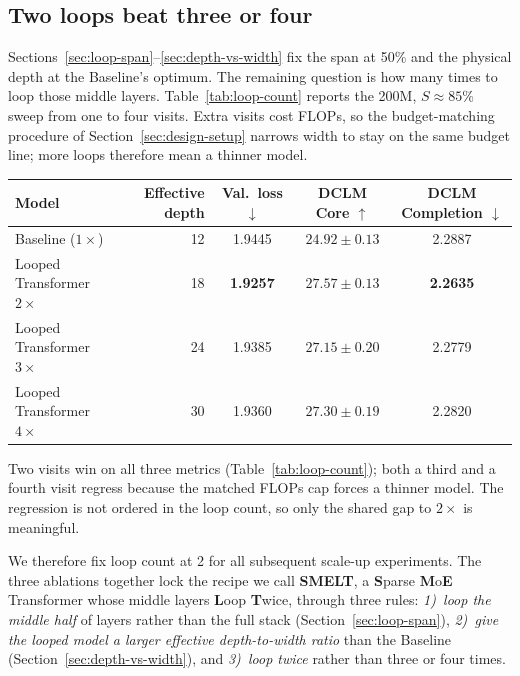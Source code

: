 \documentclass[]{bytedance_seed}
\newcommand{\archname}{SMELT}
\theoremstyle{definition}
\theoremstyle{remark}
\begin{document}
\subsection{Two loops beat three or four}
\label{sec:loop-count}

Sections~\ref{sec:loop-span}--\ref{sec:depth-vs-width} fix the span at 50\% and the physical depth at the Baseline's optimum.
%
The remaining question is how many times to loop those middle layers.
%
Table~\ref{tab:loop-count} reports the 200M, $S \approx 85\%$ sweep from one to four visits.
%
Extra visits cost FLOPs, so the budget-matching procedure of Section~\ref{sec:design-setup} narrows width to stay on the same budget line; more loops therefore mean a thinner model.
%

\begin{center}
\begin{minipage}{\linewidth}
\small
{}
\label{tab:loop-count}
\centering
\begin{tabular}{lrccc}
\toprule
Model & Effective depth & Val.\ loss $\downarrow$ & DCLM Core $\uparrow$ & DCLM Completion $\downarrow$ \\
\midrule
Baseline ($1\times$) & 12 & 1.9445 & $24.92 \pm 0.13$ & 2.2887 \\
Looped Transformer $2\times$ & 18 & \textbf{1.9257} & $\mathbf{27.57 \pm 0.13}$ & \textbf{2.2635} \\
Looped Transformer $3\times$ & 24 & 1.9385 & $27.15 \pm 0.20$ & 2.2779 \\
Looped Transformer $4\times$ & 30 & 1.9360 & $27.30 \pm 0.19$ & 2.2820 \\
\bottomrule
\end{tabular}
\end{minipage}
\end{center}

Two visits win on all three metrics (Table~\ref{tab:loop-count}); both a third and a fourth visit regress because the matched FLOPs cap forces a thinner model.
%
The regression is not ordered in the loop count, so only the shared gap to $2\times$ is meaningful.
%

We therefore fix loop count at 2 for all subsequent scale-up experiments.
%
The three ablations together lock the recipe we call \textbf{\archname{}}, a \textbf{S}parse \textbf{M}o\textbf{E} Transformer whose middle layers \textbf{L}oop \textbf{T}wice, through three rules: \textit{1)~loop the middle half} of layers rather than the full stack (Section~\ref{sec:loop-span}), \textit{2)~give the looped model a larger effective depth-to-width ratio} than the Baseline (Section~\ref{sec:depth-vs-width}), and \textit{3)~loop twice} rather than three or four times.
\end{document}
